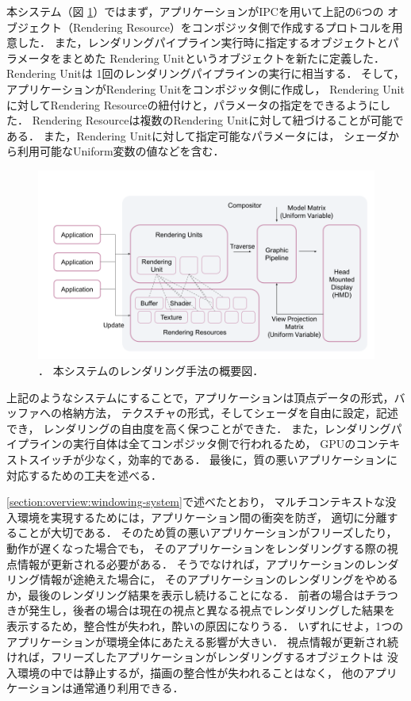 本システム（図 \ref{fig:rendering}）ではまず，アプリケーションがIPCを用いて上記の6つの
オブジェクト（Rendering Resource）をコンポジッタ側で作成するプロトコルを用意した．
また，レンダリングパイプライン実行時に指定するオブジェクトとパラメータをまとめた
Rendering Unitというオブジェクトを新たに定義した．Rendering Unitは
1回のレンダリングパイプラインの実行に相当する．
そして，アプリケーションがRendering Unitをコンポジッタ側に作成し，
Rendering Unitに対してRendering Resourceの紐付けと，パラメータの指定をできるようにした．
Rendering Resourceは複数のRendering Unitに対して紐づけることが可能である．
また，Rendering Unitに対して指定可能なパラメータには，
シェーダから利用可能なUniform変数の値などを含む．

\begin{figure}[htbp]
  \centering
  \includegraphics[keepaspectratio, width=1\linewidth]{figures/rendering.png}
  \caption{．
    本システムのレンダリング手法の概要図．
  }
  \label{fig:rendering}
\end{figure}

上記のようなシステムにすることで，アプリケーションは頂点データの形式，バッファへの格納方法，
テクスチャの形式，そしてシェーダを自由に設定，記述でき，
レンダリングの自由度を高く保つことができた．
また，レンダリングパイプラインの実行自体は全てコンポジッタ側で行われるため，
GPUのコンテキストスイッチが少なく，効率的である．
最後に，質の悪いアプリケーションに対応するための工夫を述べる．

\ref{section:overview:windowing-system}で述べたとおり，
マルチコンテキストな没入環境を実現するためには，アプリケーション間の衝突を防ぎ，
適切に分離することが大切である．
そのため質の悪いアプリケーションがフリーズしたり，動作が遅くなった場合でも，
そのアプリケーションをレンダリングする際の視点情報が更新される必要がある．
そうでなければ，アプリケーションのレンダリング情報が途絶えた場合に，
そのアプリケーションのレンダリングをやめるか，最後のレンダリング結果を表示し続けることになる．
前者の場合はチラつきが発生し，後者の場合は現在の視点と異なる視点でレンダリングした結果を
表示するため，整合性が失われ，酔いの原因になりうる．
いずれにせよ，1つのアプリケーションが環境全体にあたえる影響が大きい．
視点情報が更新され続ければ，フリーズしたアプリケーションがレンダリングするオブジェクトは
没入環境の中では静止するが，描画の整合性が失われることはなく，
他のアプリケーションは通常通り利用できる．

